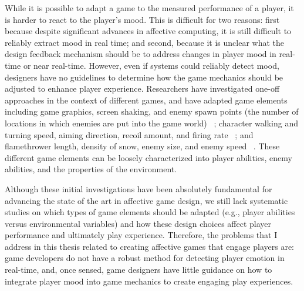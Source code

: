 While it is possible to adapt a game to the measured performance of a player, it is harder to react to the player's mood. This is difficult for two reasons: first because despite significant advances in affective computing, it is still difficult to reliably extract mood in real time; and second, because it is unclear what the design feedback mechanism should be to address changes in player mood in real-time or near real-time. However, even if systems could reliably detect mood, designers have no guidelines to determine how the game mechanics should be adjusted to enhance player experience. Researchers have investigated one-off approaches in the context of different games, and have adapted game elements including game graphics, screen shaking, and enemy spawn points (the number of locations in which enemies are put into the game world) ~\cite{dekker2007please}; character walking and turning speed, aiming direction, recoil amount, and firing rate ~\cite{epp2011identifying}; and flamethrower length, density of snow, enemy size, and enemy speed ~\cite{nacke2011biofeedback}. These different game elements can be loosely characterized into player abilities, enemy abilities, and the properties of the environment.

Although these initial investigations have been absolutely fundamental for advancing the state of the art in affective game design, we still lack systematic studies on which types of game elements should be adapted (e.g., player abilities versus environmental variables) and how these design choices affect player performance and ultimately play experience. Therefore, the problems that I address in this thesis related to creating affective games that engage players are: game developers do not have a robust method for detecting player emotion in real-time, and, once sensed, game designers have little guidance on how to integrate player mood into game mechanics to create engaging play experiences.

